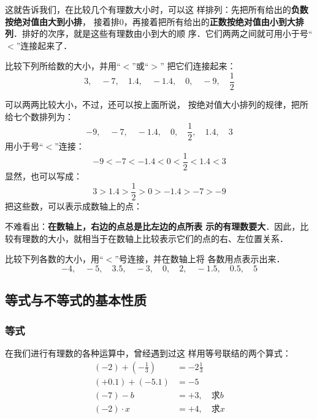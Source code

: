   这就告诉我们，在比较几个有理数大小时，可以这
样排列：先把所有给出的\textbf{负数按绝对值由大到小排}，
接着排0，再接着把所有给出的\textbf{正数按绝对值由小到大排
列}．排好的次序，就是这些有理数由小到大的顺
序．它们两两之间就可用小于号“$<$”连接起来了．

\begin{example}
 比较下列所给数的大小，并用“$<$”或“$>$”
把它们连接起来：   
\[3,\quad -7,\quad 1.4,\quad -1.4,\quad 0,\quad -9,\quad \frac{1}{2} \]
\end{example}

\begin{solution}
 可以两两比较大小，不过，还可以按上面所说，
    按绝对值大小排列的规律，把所给七个数排列为：
\[-9,\quad -7,\quad -1.4,\quad 0,\quad \frac{1}{2},\quad 1.4,\quad 3  \]
用小于号“$<$”连接：
\[-9<-7<-1.4<0< \frac{1}{2}< 1.4<3  \]
显然，也可以写成：
\[3>1.4>\frac{1}{2}>0>-1.4>-7>-9 \]
把这些数，可以表示成数轴上的点：
\begin{figure}[htp]
    \centering
    \caption{}
\end{figure}
\end{solution}

不难看出：\textbf{在数轴上，右边的点总是比左边的点所表
示的有理数要大}．因此，比较有理数的大小，就相当于在数轴上比较表示它们的点的右、左位置关系．

\begin{ex}
    比较下列各数的大小，用“$<$”号连接，并在数轴上将
    各数用点表示出来．
    \[-4,\quad -5,\quad 3.5,\quad -3,\quad 0,\quad 2,\quad -1.5,\quad 0.5,\quad 5  \]
\end{ex}

\subsection{等式与不等式的基本性质}
\subsubsection{等式}
在我们进行有理数的各种运算中，曾经遇到过这
样用等号联结的两个算式：
\[\begin{split}
(-2)+\left(-\frac{1}{3}\right) &=-2\frac{1}{3}\\
(+0.1)+(-5.1)&=-5\\
(-7)-b&=+3,\quad \text{求$b$}    \\
(-2)\cdot x&=+4,\quad \text{求$x$}    \\
\end{split}\]

